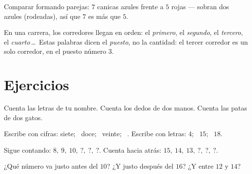 \begin{omfigure}

{\small Comparar formando parejas: $7$ canicas azules frente a $5$ rojas
--- sobran dos azules (rodeadas), así que $7$ es más que $5$.}
\end{omfigure}

\begin{example}\label{ex:g1:counting:ordinal}
En una carrera, los corredores llegan en orden: el \emph{primero}, el
\emph{segundo}, el \emph{tercero}, el \emph{cuarto}\,\dots\ Estas
palabras dicen el \emph{puesto}, no la cantidad: el tercer corredor es
un solo corredor, en el puesto número $3$.
\end{example}

\section{Ejercicios}

\begin{exercise}[$\star$]\label{exo:g1:counting:1}
Cuenta las letras de tu nombre. Cuenta los dedos de dos
manos. Cuenta las patas de dos gatos.
\end{exercise}

\begin{exercise}[$\star$]\label{exo:g1:counting:2}
Escribe con cifras: siete; \ doce; \ veinte; \ . Escribe con letras:
$4$; \ $15$; \ $18$.
\end{exercise}

\begin{exercise}[$\star$]\label{exo:g1:counting:3}
Sigue contando: $8,\ 9,\ 10,\ ?,\ ?,\ ?$. Cuenta hacia atrás:
$15,\ 14,\ 13,\ ?,\ ?,\ ?$.
\end{exercise}

\begin{exercise}[$\star$]\label{exo:g1:counting:4}
¿Qué número va justo antes del $10$? ¿Y justo después del $16$? ¿Y entre
$12$ y $14$?
\end{exercise}

